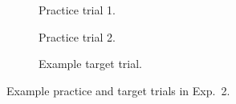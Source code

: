 \documentclass[11pt,letterpaper]{article}
\begin{document}
\begin{figure}
\centering 
\begin{subfigure}{.7\textwidth}
\caption{Practice trial 1.}
\end{subfigure}

\begin{subfigure}{\textwidth}
\caption{Practice trial 2.}
\end{subfigure}

\begin{subfigure}{\textwidth}
\caption{Example target trial.}
\end{subfigure}

\caption{Example practice and target trials in Exp.~2.}
\label{fig:exp2-task}

\end{figure}
\end{document}
